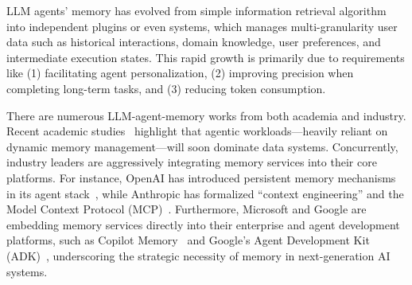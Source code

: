 \documentclass{llmxive}
\providecommand{\zxh}[1]{#1}
\begin{document}
LLM agents' memory has evolved from simple information retrieval algorithm into independent plugins or even systems, which manages multi-granularity user data such as historical interactions, domain knowledge, user preferences, and intermediate execution states. This rapid growth is primarily due to requirements like (1) facilitating agent personalization, (2) 
improving precision when completing long-term tasks, and (3) reducing token consumption.  %

There are numerous LLM-agent-memory works from both academia and industry. Recent academic studies~\cite{luo2026data, khan2026rag, liu2026supporting} highlight that agentic workloads—heavily reliant on dynamic memory management—will soon dominate data systems. Concurrently, industry leaders are aggressively integrating memory services into their core platforms. For instance, OpenAI has introduced persistent memory mechanisms in its agent stack~\cite{openai2026agents}, while Anthropic has formalized ``context engineering'' and the Model Context Protocol (MCP)~\cite{anthropic2025context, anthropic2024mcp}. Furthermore, Microsoft and Google are embedding memory services directly into their enterprise and agent development platforms, such as Copilot Memory~\cite{microsoft2025copilot} and Google's Agent Development Kit (ADK)~\cite{google2025adk}, underscoring the strategic necessity of memory in next-generation AI systems.



\end{document}
